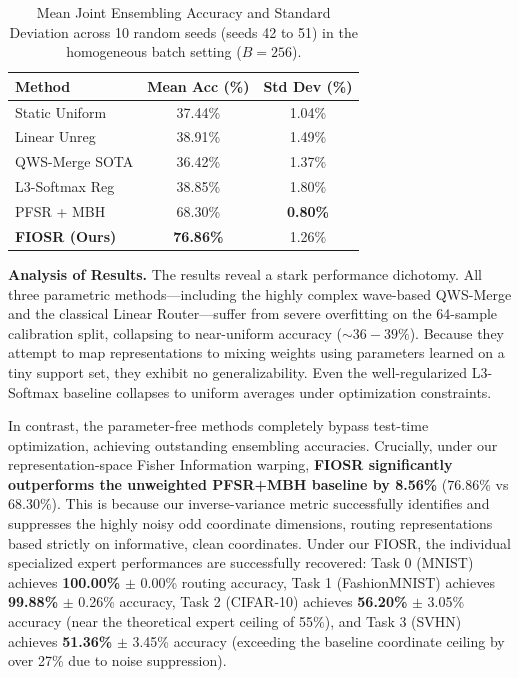 \begin{table}[h]
\caption{Mean Joint Ensembling Accuracy and Standard Deviation across 10 random seeds (seeds 42 to 51) in the homogeneous batch setting ($B=256$).}
\label{tab:homo_results}
\begin{center}
\begin{small}
\begin{sc}
\begin{tabular}{lcc}
\toprule
Method & Mean Acc (\%) & Std Dev (\%) \\
\midrule
Static Uniform & 37.44\% & 1.04\% \\
Linear Unreg & 38.91\% & 1.49\% \\
QWS-Merge SOTA & 36.42\% & 1.37\% \\
L3-Softmax Reg & 38.85\% & 1.80\% \\
PFSR + MBH & 68.30\% & \textbf{0.80\%} \\
\textbf{FIOSR (Ours)} & \textbf{76.86\%} & 1.26\% \\
\bottomrule
\end{tabular}
\end{sc}
\end{small}
\end{center}
\end{table}

\textbf{Analysis of Results.} 
The results reveal a stark performance dichotomy. All three parametric methods—including the highly complex wave-based QWS-Merge and the classical Linear Router—suffer from severe overfitting on the 64-sample calibration split, collapsing to near-uniform accuracy ($\sim 36-39\%$). Because they attempt to map representations to mixing weights using parameters learned on a tiny support set, they exhibit no generalizability. Even the well-regularized L3-Softmax baseline collapses to uniform averages under optimization constraints.

In contrast, the parameter-free methods completely bypass test-time optimization, achieving outstanding ensembling accuracies. Crucially, under our representation-space Fisher Information warping, \textbf{FIOSR significantly outperforms the unweighted PFSR+MBH baseline by 8.56\%} ($76.86\%$ vs $68.30\%$). This is because our inverse-variance metric successfully identifies and suppresses the highly noisy odd coordinate dimensions, routing representations based strictly on informative, clean coordinates. Under our FIOSR, the individual specialized expert performances are successfully recovered: Task 0 (MNIST) achieves \textbf{100.00\%} $\pm$ 0.00\% routing accuracy, Task 1 (FashionMNIST) achieves \textbf{99.88\%} $\pm$ 0.26\% accuracy, Task 2 (CIFAR-10) achieves \textbf{56.20\%} $\pm$ 3.05\% accuracy (near the theoretical expert ceiling of 55\%), and Task 3 (SVHN) achieves \textbf{51.36\%} $\pm$ 3.45\% accuracy (exceeding the baseline coordinate ceiling by over 27\% due to noise suppression).

